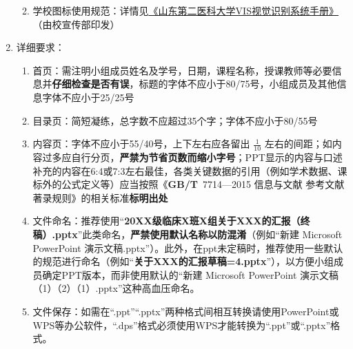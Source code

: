 \begin{enumerate}
\begin{enumerate}
                  \item 学校图标使用规范：详情见\uline{\href{https://www.wfmc.edu.cn/4229/list.htm}{《山东第二医科大学VIS视觉识别系统手册》}}（由校宣传部印发）
            \end{enumerate}
      \item 详细要求：
            \begin{enumerate}
                  \item 首页：需注明小组成员姓名及学号，日期，课程名称，授课教师等必要信息并\textbf{仔细检查是否有误}，标题的字体不应小于80/75号，小组成员及其他信息字体不应小于25/25号
                  \item 目录页：简短凝练，总字数不应超过35个字；字体不应小于80/55号
                  \item 内容页：字体\footnotemark 不应小于55/40号，上下左右应各留出 $\frac{1}{10}$ 左右的间距；如内容过多应自行分页，\textbf{严禁为节省页数而缩小字号}；PPT显示的内容与口述补充的内容在6:4或7:3左右最佳，各类关键数据的引用（例如学术数据、课标外的公式定义等）应当按照\linebreak[3]《\textbf{GB/T}\ 7714—2015 信息与文献 参考文献著录规则》的相关标准\textbf{标明出处}
                  \item 文件命名\footnotemark：推荐使用“\textbf{20XX级临床X班X组关于XXX的汇报（终稿）.pptx}”此类命名，\textbf{严禁使用默认名称以防混淆}（例如“新建 Microsoft PowerPoint 演示文稿.pptx”）。此外，在ppt未定稿时，推荐使用一些默认的规范进行命名（例如“\textbf{关于XXX的汇报草稿=4.pptx}”），以方便小组成员确定PPT版本，而非使用默认的“新建 Microsoft PowerPoint 演示文稿（1）（2）（1）.pptx”这种高血压命名。
                  \item 文件保存\footnotemark：如需在“.ppt”“.pptx”两种格式间相互转换请使用PowerPoint或WPS等办公软件，“.dps”格式必须使用WPS才能转换为“.ppt”或“.pptx”格式。
            \end{enumerate}

\end{enumerate}

